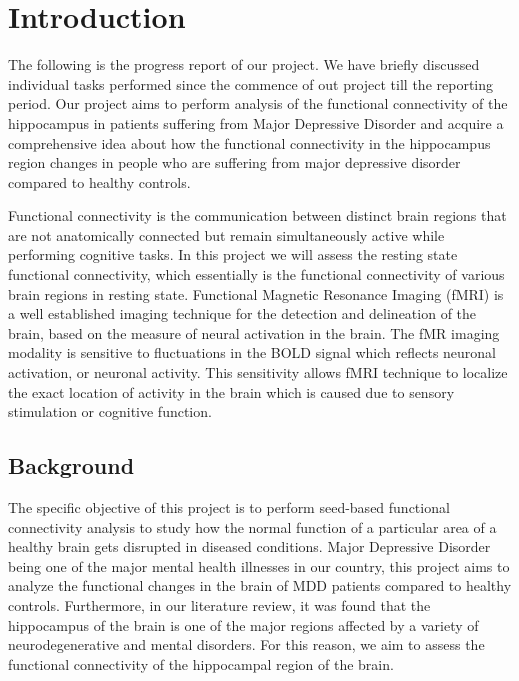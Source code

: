 \documentclass[12pt]{article}
\begin{document}
\newpage

\begingroup
  \fontsize{12pt}{12pt}\selectfont

\vskip -10pt
\enlargethispage{\baselineskip}
\thispagestyle{empty}
\addcontentsline{}{}{}
\tableofcontents

\endgroup
\newpage

\clearpage
\setcounter{page}{1}

\section{Introduction}

The following is the progress report of our project. We have briefly discussed
individual tasks performed since the commence of out project till the reporting
period. Our project aims to perform analysis of the functional connectivity of
the hippocampus in patients suffering from Major Depressive Disorder and
acquire a comprehensive idea about how the functional connectivity in the
hippocampus region changes in people who are suffering from major depressive
disorder compared to healthy controls.

Functional connectivity is the communication between distinct brain
regions that are not anatomically connected but remain simultaneously
active while performing cognitive tasks. In this project we will
assess the resting state functional connectivity, which essentially is
the functional connectivity of various brain regions in resting state.
Functional Magnetic Resonance Imaging (fMRI) is a well established
imaging technique for the detection and delineation of the brain,
based on the measure of neural activation in the brain. The fMR
imaging modality is sensitive to fluctuations in the BOLD signal which
reflects neuronal activation, or neuronal activity. This sensitivity
allows fMRI technique to localize the exact location of activity in
the brain which is caused due to sensory stimulation or cognitive
function.

\subsection{Background}

The specific objective of this project is to perform seed-based
functional connectivity analysis to study how the normal function of a
particular area of a healthy brain gets disrupted in diseased
conditions. Major Depressive Disorder being one of the major mental
health illnesses in our country, this project aims to analyze the
functional changes in the brain of MDD patients compared to healthy
controls. Furthermore, in our literature review, it was found that the
hippocampus of the brain is one of the major regions affected by a
variety of neurodegenerative and mental disorders. For this reason, we
aim to assess the functional connectivity of the hippocampal region of
the brain.
\end{document}
